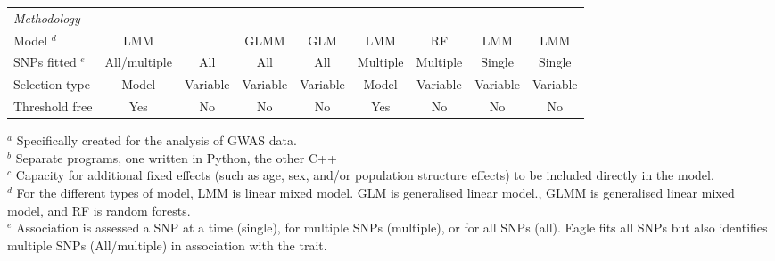 \documentclass{article}
\begin{document}
\begin{landscape}
\begin{table}
\begin{tabular}{lcccccccc}
{\em Methodology}    &         &            &             &                   &            &                &      &      \\  [0.35cm]
\hspace{1mm}  Model $^d$                    & LMM   &   &  GLMM &   GLM  & LMM  & RF & LMM   & LMM \\ [0.15cm]

\hspace{1mm} SNPs fitted $^e$      &    All/multiple      &    All       &   All        &      All          &  Multiple          &  Multiple              &   Single   &  Single   \\  [0.35cm]


\hspace{1mm}  Selection type             & Model   & Variable  &  Variable &  Variable  &  Model  &  Variable & Variable  & Variable \\  [0.35cm]

\hspace{1mm} Threshold free      &    Yes     &  No    &  No         &    No               &     Yes       &  No              &  No   & No      \\  [0.15cm]  \hline
           

\end{tabular}
{$^a$ \scriptsize{Specifically created for the analysis of GWAS data.}}\\
{$^b$ \scriptsize{Separate programs, one written in Python, the other C++}} \\
{$^c$ \scriptsize{Capacity for additional fixed effects (such as  age, sex, and/or population structure effects) to be included directly in the model.}} \\
{$^d$ \scriptsize{For the different types of model, 
LMM is linear mixed model.  GLM is generalised linear model., GLMM is generalised linear mixed model, and RF is random forests.}} \\
{$^e$ \scriptsize{Association is assessed a SNP at a time (single), for multiple SNPs (multiple), or for all SNPs (all). Eagle fits all SNPs but also identifies multiple SNPs (All/multiple) in association with the trait.} } \\
\end{table}


\end{landscape}
\end{document}
